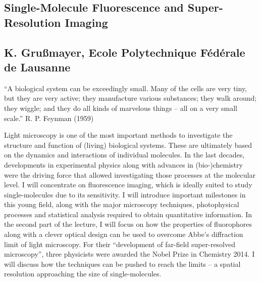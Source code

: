 \subsection*{Single-Molecule Fluorescence and Super-Resolution Imaging}
\subsection*{K. Gru\ss mayer, Ecole Polytechnique Fédérale de Lausanne}
\noindent 
“A biological system can be exceedingly small. Many of the cells are very
tiny, but they are very active; they manufacture various substances; they walk
around; they wiggle; and they do all kinds of marvelous things – all on a very
small scale.” R. P. Feynman (1959)\newline

Light microscopy is one of the most important methods to investigate the
structure and function of (living) biological systems. These are ultimately
based on the dynamics and interactions of individual molecules. In the last
decades, developments in experimental physics along with advances in
(bio-)chemistry were the driving force that allowed investigating those
processes at the molecular level. I will concentrate on fluorescence imaging,
which is ideally suited to study single-molecules due to its sensitivity. I
will introduce important milestones in this young field, along with the major
microscopy techniques, photophysical processes and statistical analysis
required to obtain quantitative information.  In the second part of the
lecture, I will focus on how the properties of fluorophores along with a
clever optical design can be used to overcome Abbe’s diffraction limit of
light microscopy. For their “development of far-field super-resolved
microscopy”, three physicists were awarded the Nobel Prize in Chemistry
2014. I will discuss how the techniques can be pushed to reach the limits – a
spatial resolution approaching the size of single-molecules. 
